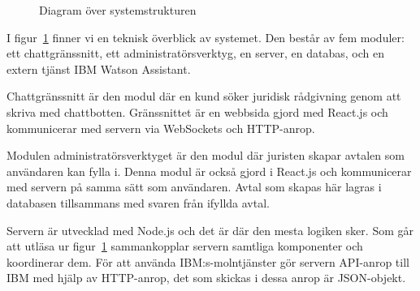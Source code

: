 \documentclass[a4paper,12pt]{article}
\begin{document}
\newcommand{\doublearrow}[4][0]{%
\draw ($#2 + (-#4, -#1)$) edge[->] ($#3 + (-#4, -#1)$)
      ($#3 + (#4, #1)$)   edge[->] ($#2 + (#4, #1)$);
}
\begin{figure}[H]
  \centering
  \smallskip
  \smallskip
  \caption{Diagram över systemstrukturen}
  \label{fig:system:structure}
\end{figure}

I figur~\ref{fig:system:structure} finner vi en teknisk överblick av systemet. Den består av fem moduler: ett chattgränssnitt, ett administratörsverktyg, en server, en databas, och en extern tjänst IBM Watson Assistant.

Chattgränssnitt är den modul där en kund söker juridisk rådgivning genom att skriva med chattbotten. Gränssnittet är en webbsida gjord med React.js och kommunicerar med servern via WebSockets och HTTP-anrop.

Modulen administratörsverktyget är den modul där juristen skapar avtalen som anv\-ändaren kan fylla i. Denna modul är också gjord i React.js och kommunicerar med servern på samma sätt som användaren. Avtal som skapas här lagras i databasen tillsammans med svaren från ifyllda avtal.

Servern är utvecklad med Node.js och det är där den mesta logiken sker. Som går att utläsa ur figur~\ref{fig:system:structure} sammankopplar servern samtliga komponenter och koordinerar dem. För att använda IBM:s-molntjänster gör servern API-anrop till IBM med hjälp av HTTP-anrop, det som skickas i dessa anrop är JSON-objekt.
\end{document}
